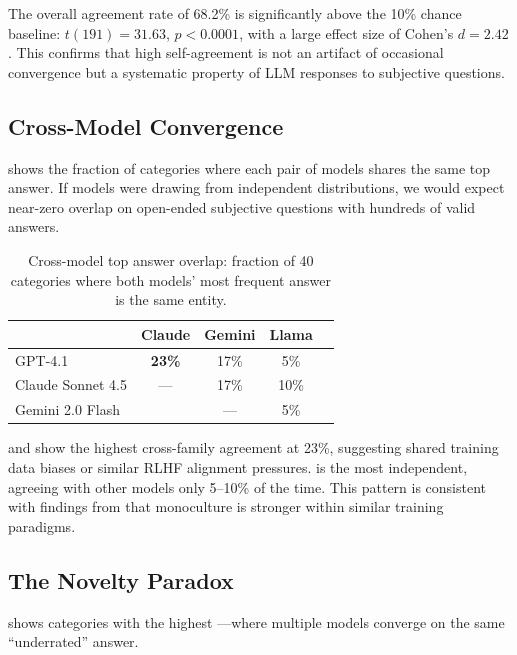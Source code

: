 The overall agreement rate of 68.2\% is significantly above the 10\% chance baseline: $t(191) = 31.63$, $p < 0.0001$, with a large effect size of Cohen's $d = 2.42$. This confirms that high self-agreement is not an artifact of occasional convergence but a systematic property of LLM responses to subjective questions.

\subsection{Cross-Model Convergence}
\label{sec:cross}

 shows the fraction of categories where each pair of models shares the same top answer. If models were drawing from independent distributions, we would expect near-zero overlap on open-ended subjective questions with hundreds of valid answers.

\begin{table}[t]
    \centering
    \caption{Cross-model top answer overlap: fraction of 40 categories where both models' most frequent answer is the same entity.}
    \begin{tabular}{@{}lcccc@{}}
        \toprule
        & \textbf{Claude} & \textbf{Gemini} & \textbf{Llama} \\
        \midrule
        GPT-4.1 & \textbf{23\%} & 17\% & 5\% \\
        Claude Sonnet 4.5 & --- & 17\% & 10\% \\
        Gemini 2.0 Flash & & --- & 5\% \\
        \bottomrule
    \end{tabular}
    \label{tab:cross}
\end{table}

\gptfour and \claude show the highest cross-family agreement at 23\%, suggesting shared training data biases or similar RLHF alignment pressures. \llama is the most independent, agreeing with other models only 5--10\% of the time. This pattern is consistent with findings from \citet{correlated2025errors} that monoculture is stronger within similar training paradigms.

\subsection{The Novelty Paradox}
\label{sec:paradox}

 shows categories with the highest \nps---where multiple models converge on the same ``underrated'' answer.

